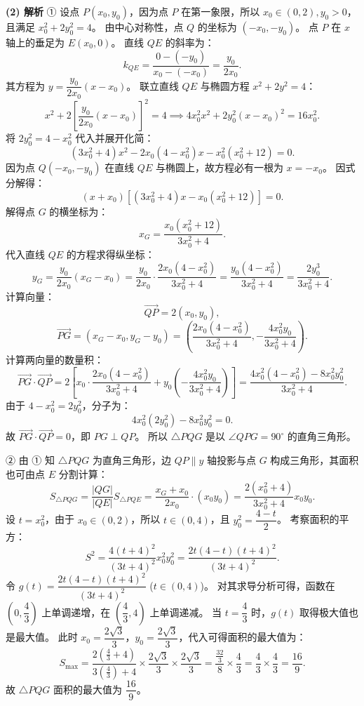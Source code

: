 \begin{answer}
\textbf{(2) 解析}
① 设点 $P(x_0, y_0)$，因为点 $P$ 在第一象限，所以 $x_0 \in (0, 2), y_0 > 0$，且满足 $x_0^2 + 2y_0^2 = 4$。
由中心对称性，点 $Q$ 的坐标为 $(-x_0, -y_0)$。
点 $P$ 在 $x$ 轴上的垂足为 $E(x_0, 0)$。
直线 $QE$ 的斜率为：
\nopagebreak[4]
\[k_{QE} = \frac{0 - (-y_0)}{x_0 - (-x_0)} = \frac{y_0}{2x_0}.\]
其方程为 $y = \dfrac{y_0}{2x_0}(x - x_0)$。
联立直线 $QE$ 与椭圆方程 $x^2 + 2y^2 = 4$：
\nopagebreak[4]
\[x^2 + 2\left[\frac{y_0}{2x_0}(x - x_0)\right]^2 = 4 \implies 4x_0^2 x^2 + 2y_0^2 (x - x_0)^2 = 16x_0^2.\]
将 $2y_0^2 = 4 - x_0^2$ 代入并展开化简：
\nopagebreak[4]
\[(3x_0^2 + 4)x^2 - 2x_0(4 - x_0^2)x - x_0^2(x_0^2 + 12) = 0.\]
因为点 $Q(-x_0, -y_0)$ 在直线 $QE$ 与椭圆上，故方程必有一根为 $x = -x_0$。
因式分解得：
\nopagebreak[4]
\[(x + x_0)\left[(3x_0^2 + 4)x - x_0(x_0^2 + 12)\right] = 0.\]
解得点 $G$ 的横坐标为：
\nopagebreak[4]
\[x_G = \frac{x_0(x_0^2 + 12)}{3x_0^2 + 4}.\]
代入直线 $QE$ 的方程求得纵坐标：
\nopagebreak[4]
\[y_G = \frac{y_0}{2x_0}(x_G - x_0) = \frac{y_0}{2x_0} \cdot \frac{2x_0(4 - x_0^2)}{3x_0^2 + 4} = \frac{y_0(4 - x_0^2)}{3x_0^2 + 4} = \frac{2y_0^3}{3x_0^2 + 4}.\]
计算向量：
\nopagebreak[4]
\[\vec{QP} = 2(x_0, y_0),\]
\nopagebreak[4]
\[\vec{PG} = (x_G - x_0, y_G - y_0) = \left(\frac{2x_0(4 - x_0^2)}{3x_0^2 + 4}, -\frac{4x_0^2 y_0}{3x_0^2 + 4}\right).\]
计算两向量的数量积：
\nopagebreak[4]
\[\vec{PG} \cdot \vec{QP} = 2 \left[ x_0 \cdot \frac{2x_0(4 - x_0^2)}{3x_0^2 + 4} + y_0 \left(-\frac{4x_0^2 y_0}{3x_0^2 + 4}\right) \right] = \frac{4x_0^2(4 - x_0^2) - 8x_0^2 y_0^2}{3x_0^2 + 4}.\]
由于 $4 - x_0^2 = 2y_0^2$，分子为：
\nopagebreak[4]
\[4x_0^2(2y_0^2) - 8x_0^2 y_0^2 = 0.\]
故 $\vec{PG} \cdot \vec{QP} = 0$，即 $PG \perp QP$。
所以 $\triangle PQG$ 是以 $\angle QPG = 90^\circ$ 的直角三角形。

② 由 ① 知 $\triangle PQG$ 为直角三角形，边 $QP \parallel y$ 轴投影与点 $G$ 构成三角形，其面积也可由点 $E$ 分割计算：
\nopagebreak[4]
\[S_{\triangle PQG} = \frac{|QG|}{|QE|} S_{\triangle PQE} = \frac{x_G + x_0}{2x_0} \cdot (x_0 y_0) = \frac{2(x_0^2 + 4)}{3x_0^2 + 4} x_0 y_0.\]
设 $t = x_0^2$，由于 $x_0 \in (0, 2)$，所以 $t \in (0, 4)$，且 $y_0^2 = \dfrac{4 - t}{2}$。
考察面积的平方：
\nopagebreak[4]
\[S^2 = \frac{4(t+4)^2}{(3t+4)^2} x_0^2 y_0^2 = \frac{2t(4-t)(t+4)^2}{(3t+4)^2}.\]
令 $g(t) = \dfrac{2t(4-t)(t+4)^2}{(3t+4)^2}$ ($t \in (0, 4)$)。
对其求导分析可得，函数在 $\left(0, \dfrac{4}{3}\right)$ 上单调递增，在 $\left(\dfrac{4}{3}, 4\right)$ 上单调递减。
当 $t = \dfrac{4}{3}$ 时，$g(t)$ 取得极大值也是最大值。
此时 $x_0 = \dfrac{2\sqrt{3}}{3}$，$y_0 = \dfrac{2\sqrt{3}}{3}$，代入可得面积的最大值为：
\nopagebreak[4]
\[S_{\max} = \frac{2\left(\frac{4}{3} + 4\right)}{3\left(\frac{4}{3}\right) + 4} \times \frac{2\sqrt{3}}{3} \times \frac{2\sqrt{3}}{3} = \frac{\frac{32}{3}}{8} \times \frac{4}{3} = \frac{4}{3} \times \frac{4}{3} = \frac{16}{9}.\]
故 $\triangle PQG$ 面积的最大值为 $\dfrac{16}{9}$。


\end{answer}
